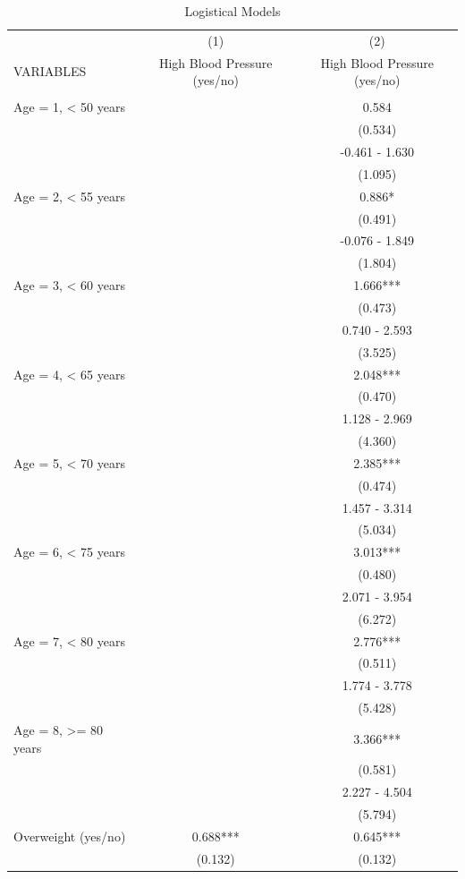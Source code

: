 \documentclass{article}
\begin{document}
\begin{enumerate}[a.]
\begin{table}[!h]
\caption{Logistical Models} 
\begin{center}
\begin{tabular}{lcc} \hline
 & (1) & (2) \\
VARIABLES & High Blood Pressure (yes/no) & High Blood Pressure (yes/no) \\ \hline
 &  &  \\
Age = 1, < 50 years &  & 0.584 \\
 &  & (0.534) \\
 &  & -0.461 - 1.630 \\
 &  & (1.095) \\
Age = 2, < 55 years &  & 0.886* \\
 &  & (0.491) \\
 &  & -0.076 - 1.849 \\
 &  & (1.804) \\
Age = 3, < 60 years &  & 1.666*** \\
 &  & (0.473) \\
 &  & 0.740 - 2.593 \\
 &  & (3.525) \\
Age = 4, < 65 years &  & 2.048*** \\
 &  & (0.470) \\
 &  & 1.128 - 2.969 \\
 &  & (4.360) \\
Age = 5, < 70 years &  & 2.385*** \\
 &  & (0.474) \\
 &  & 1.457 - 3.314 \\
 &  & (5.034) \\
Age = 6, < 75 years &  & 3.013*** \\
 &  & (0.480) \\
 &  & 2.071 - 3.954 \\
 &  & (6.272) \\
Age = 7, < 80 years &  & 2.776*** \\
 &  & (0.511) \\
 &  & 1.774 - 3.778 \\
 &  & (5.428) \\
Age = 8, >= 80 years &  & 3.366*** \\
 &  & (0.581) \\
 &  & 2.227 - 4.504 \\
 &  & (5.794) \\
Overweight (yes/no) & 0.688*** & 0.645*** \\
 & (0.132) & (0.132) \\

\end{tabular}
\end{center}
\end{table}
\end{enumerate}
\end{document}
